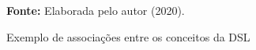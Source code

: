 \begin{figure}[ht!]
\centering

\caption{\textmd{Exemplo de associações entre os conceitos da DSL}}
\label{fig:objetos}

\par\medskip\textbf{Fonte:} Elaborada pelo autor (2020). \par\medskip

\end{figure}

